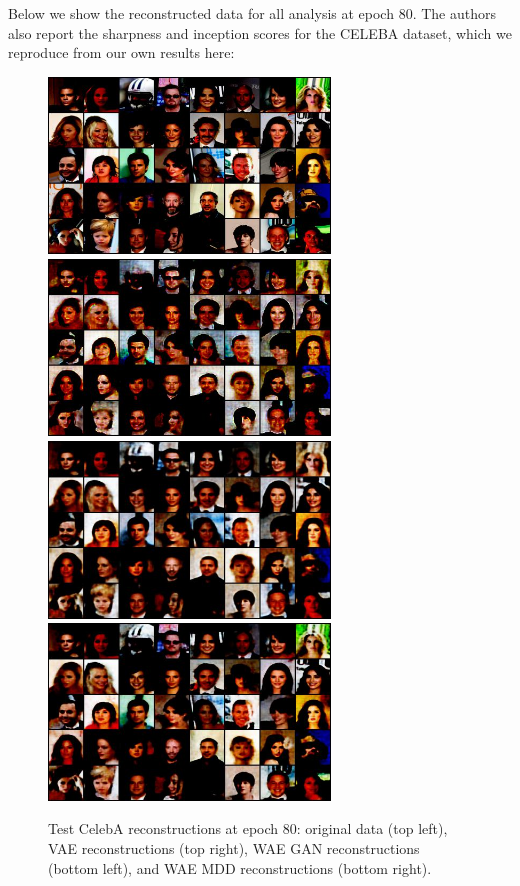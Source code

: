 \documentclass[12pt,english]{amsart}
\begin{document}
Below we show the reconstructed data for all analysis at epoch 80. The authors
also report the sharpness and inception scores for the CELEBA dataset, which we
reproduce from our own results here: \\

\begin{figure}[htp]
\centering
\includegraphics[width=75mm]{celeb_vae_ep_79_data}
\includegraphics[width=75mm]{celeb_vae_ep_79_recon}
\includegraphics[width=75mm]{celeb_wae-mmd_ep_79_recon}
\includegraphics[width=75mm]{celeb_wae-gan_ep_79_recon}
\caption{Test CelebA reconstructions at epoch 80: original data (top left), VAE
         reconstructions (top right), WAE GAN reconstructions (bottom left), and
         WAE MDD reconstructions (bottom right).}
\label{Figure 2}
\end{figure}
\end{document}
